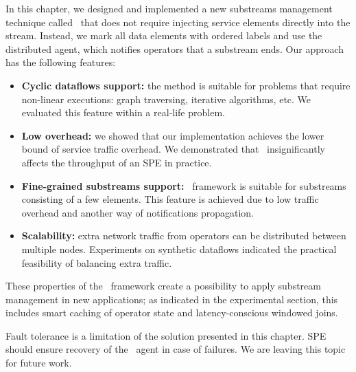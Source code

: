 In this chapter, we designed and implemented a new substreams management technique called \tracker\ that does not require injecting service elements directly into the stream. Instead, we mark all data elements with ordered labels and use the distributed agent, which notifies operators that a substream ends. Our approach has the following features:

\begin{itemize}
     \item {\bf Cyclic dataflows support:} the method is suitable for problems that require non-linear executions: graph traversing, iterative algorithms, etc. We evaluated this feature within a real-life problem.
     \item {\bf Low overhead:} we showed that our implementation achieves the lower bound of service traffic overhead. We demonstrated that \tracker\ insignificantly affects the throughput of an SPE in practice.
     \item {\bf Fine-grained substreams support:} \tracker\ framework is suitable for substreams consisting of a few elements. This feature is achieved due to low traffic overhead and another way of notifications propagation.
     \item {\bf Scalability:} extra network traffic from operators can be distributed between multiple nodes. Experiments on synthetic dataflows indicated the practical feasibility of balancing extra traffic.
\end{itemize}

These properties of the \tracker\ framework create a possibility to apply substream management in new applications; as indicated in the experimental section, this includes smart caching of operator state and latency-conscious windowed joins.

Fault tolerance is a limitation of the solution presented in this chapter. SPE should ensure recovery of the \tracker\ agent in case of failures. We are leaving this topic for future work.
